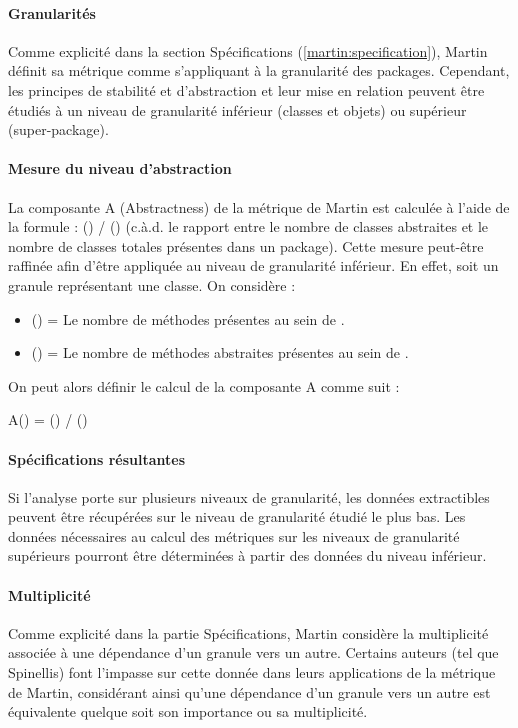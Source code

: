 \documentclass{scrartcl}
\begin{document}
    \paragraph{Granularités}Comme explicité dans la section Spécifications (\ref{martin:specification}), Martin définit sa métrique comme s'appliquant à la granularité des packages. Cependant, les principes de stabilité et d'abstraction et leur mise en relation peuvent être étudiés à un niveau de granularité inférieur (classes et objets) ou supérieur (super-package).
    
    \paragraph{Mesure du niveau d'abstraction}La composante A (Abstractness) de la métrique de Martin est calculée à l'aide de la formule : 
    \numberOfabstractClass{}(\granule{}) / {\numberOfClass{}(\granule{})} (c.à.d. le rapport entre le nombre de classes abstraites et le nombre de classes totales présentes dans un package). Cette mesure peut-être raffinée afin d'être appliquée au niveau de granularité inférieur. En effet, soit \granule{} un granule représentant une classe. On considère :
    \begin{itemize}
        \item \numberOfMethod{}(\granule{}{}) = Le nombre de méthodes présentes au sein de \granule{}.
        \item \numberOfabstractMethod{}(\granule{}) = Le nombre de méthodes abstraites présentes au sein de \granule{}.
    \end{itemize}
    On peut alors définir le calcul de la composante A comme suit :
    {\centering
        A(\granule{}) = \numberOfabstractMethod{}(\granule{}) / \numberOfMethod{}(\granule{}{})
    \par}
    
    \paragraph{Spécifications résultantes}Si l'analyse porte sur plusieurs niveaux de granularité, les données extractibles peuvent être récupérées sur le niveau de granularité étudié le plus bas. Les données nécessaires au calcul des métriques sur les niveaux de granularité supérieurs pourront être déterminées à partir des données du niveau inférieur.
    
    \paragraph{Multiplicité}Comme explicité dans la partie Spécifications, Martin considère la multiplicité associée à une dépendance d'un granule vers un autre. Certains auteurs (tel que Spinellis\cite{Spinellis:2006}) font l'impasse sur cette donnée dans leurs applications de la métrique de Martin, considérant ainsi qu'une dépendance d'un granule vers un autre est équivalente quelque soit son importance ou sa multiplicité.
\end{document}
